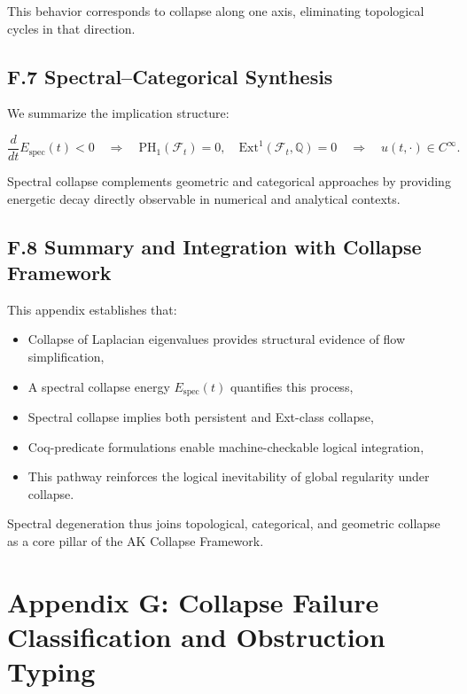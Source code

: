 \documentclass[11pt]{article}
\begin{document}
This behavior corresponds to collapse along one axis, eliminating topological cycles in that direction.

\subsection{F.7 Spectral–Categorical Synthesis}

We summarize the implication structure:

\[
\frac{d}{dt} E_{\mathrm{spec}}(t) < 0 \quad \Rightarrow \quad
\mathrm{PH}_1(\mathcal{F}_t) = 0, \quad \mathrm{Ext}^1(\mathcal{F}_t, \mathbb{Q}) = 0
\quad \Rightarrow \quad u(t,\cdot) \in C^\infty.
\]

Spectral collapse complements geometric and categorical approaches by providing energetic decay directly observable in numerical and analytical contexts.

\subsection{F.8 Summary and Integration with Collapse Framework}

This appendix establishes that:

\begin{itemize}
  \item Collapse of Laplacian eigenvalues provides structural evidence of flow simplification,
  \item A spectral collapse energy \( E_{\mathrm{spec}}(t) \) quantifies this process,
  \item Spectral collapse implies both persistent and Ext-class collapse,
  \item Coq-predicate formulations enable machine-checkable logical integration,
  \item This pathway reinforces the logical inevitability of global regularity under collapse.
\end{itemize}

Spectral degeneration thus joins topological, categorical, and geometric collapse as a core pillar of the AK Collapse Framework.




\appendix
\section*{Appendix G: \texorpdfstring{Collapse Failure Classification and Obstruction Typing}{Collapse Failure Classification and Obstruction Typing}}
\end{document}
